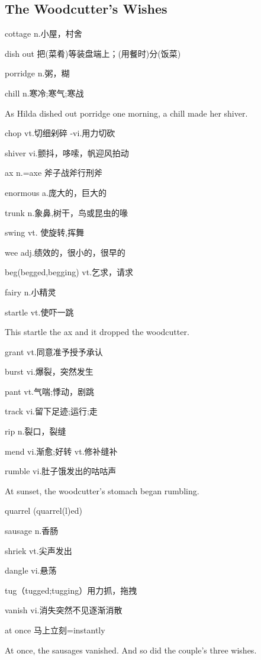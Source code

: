 \documentclass[utf8]{ctexart}
\begin{document}
	\subsection{The Woodcutter's Wishes}
	\par cottage n.小屋，村舍
	\par dish out 把(菜肴)等装盘端上；(用餐时)分(饭菜)	
	\par porridge n.粥，糊
	\par chill n.寒冷;寒气;寒战		
	\par As Hilda dished out porridge one morning, a chill made her shiver.
	\par chop vt.切细剁碎 -vi.用力切砍
	\par shiver vi.颤抖，哆嗦，帆迎风拍动
	\par ax n.=axe 斧子战斧行刑斧				
	\par enormous a.庞大的，巨大的
	\par trunk n.象鼻,树干，鸟或昆虫的喙		
	\par swing 	vt. 使旋转,挥舞
	\par wee adj.绩效的，很小的，很早的
	\par beg(begged,begging) vt.乞求，请求		
	\par fairy n.小精灵	
	\par startle vt.使吓一跳
	\par This startle the ax and it dropped the woodcutter.	
	\par grant vt.同意准予授予承认	
	\par burst vi.爆裂，突然发生
	\par pant vt.气喘;悸动，剧跳
	\par track vi.留下足迹;运行;走
	\par rip n.裂口，裂缝
	\par mend vi.渐愈;好转 vt.修补缝补
	\par rumble vi.肚子饿发出的咕咕声
	\par At sunset, the woodcutter's stomach began rumbling.
	\par quarrel (quarrel(l)ed)
	\par sausage n.香肠
	\par shriek vt.尖声发出
	\par dangle vi.悬荡
	\par tug（tugged;tugging）用力抓，拖拽
	\par vanish vi.消失突然不见逐渐消散	
	\par at once 马上立刻=instantly
	\par At once, the sausages vanished. And so did the couple's three wishes.	
\end{document}
